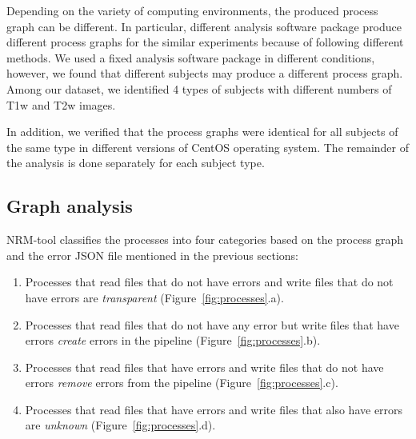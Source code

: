 \documentclass[a4paper,num-refs]{oup-contemporary}
\begin{document}
Depending on the variety of computing environments, the produced 
process graph can be different. In particular, different analysis 
software package produce different process graphs for the similar 
experiments because of following different methods. We used a fixed 
analysis software package in different conditions, however, we found 
that different subjects may produce a different process graph. Among 
our dataset, we identified 4 types of subjects with different numbers 
of T1w and T2w images. 

In addition, we verified that the process graphs were identical for all 
subjects of the same type in different versions of CentOS operating 
system. The remainder of the analysis is done separately for each 
subject type.

\subsection{Graph analysis}

NRM-tool classifies the processes into four 
categories based on the process graph and the error JSON file 
mentioned in the previous sections:
\begin{enumerate}
\item Processes that read files that do not have errors and write files 
that do not have errors are \emph{transparent} (Figure~\ref{fig:processes}.a).
\item Processes that read files 
that do not have any error but write files that have errors 
\emph{create} errors in the pipeline (Figure~\ref{fig:processes}.b).
\item Processes that read files 
that have errors and write files that do not have errors \emph{remove} 
errors from the pipeline (Figure~\ref{fig:processes}.c).
\item Processes that read files that have errors and write files that also have errors are 
\emph{unknown} (Figure~\ref{fig:processes}.d).
\end{enumerate}
\end{document}
